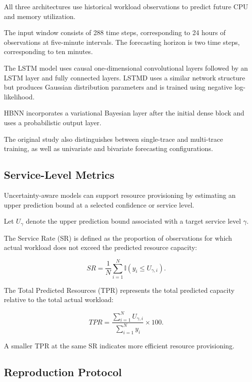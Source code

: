\documentclass[conference]{IEEEtran}
\begin{document}
All three architectures use historical workload observations to predict future CPU and memory utilization.

The input window consists of 288 time steps, corresponding to 24 hours of observations at five-minute intervals. The forecasting horizon is two time steps, corresponding to ten minutes.

The LSTM model uses causal one-dimensional convolutional layers followed by an LSTM layer and fully connected layers. LSTMD uses a similar network structure but produces Gaussian distribution parameters and is trained using negative log-likelihood.

HBNN incorporates a variational Bayesian layer after the initial dense block and uses a probabilistic output layer.

The original study also distinguishes between single-trace and multi-trace training, as well as univariate and bivariate forecasting configurations.

\subsection{Service-Level Metrics}

Uncertainty-aware models can support resource provisioning by estimating an upper prediction bound at a selected confidence or service level.

Let $U_{\gamma}$ denote the upper prediction bound associated with a target service level $\gamma$.

The Service Rate (SR) is defined as the proportion of observations for which actual workload does not exceed the predicted resource capacity:

\begin{equation}
SR =
\frac{1}{N}
\sum_{i=1}^{N}
\mathbb{I}(y_i \leq U_{\gamma,i}).
\end{equation}

The Total Predicted Resources (TPR) represents the total predicted capacity relative to the total actual workload:

\begin{equation}
TPR =
\frac{\sum_{i=1}^{N} U_{\gamma,i}}
{\sum_{i=1}^{N} y_i}
\times 100.
\end{equation}

A smaller TPR at the same SR indicates more efficient resource provisioning.

\subsection{Reproduction Protocol}
\end{document}
